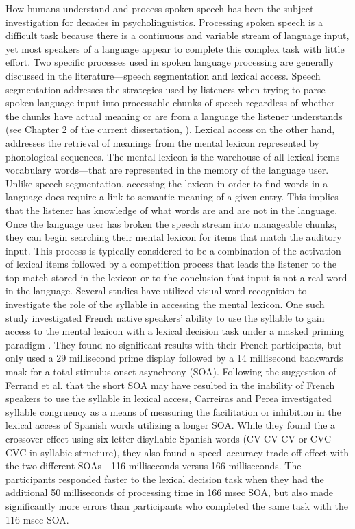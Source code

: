 How humans understand and process spoken speech has been the subject investigation for decades in psycholinguistics. Processing spoken speech is a difficult task because there is a continuous and variable stream of language input, yet most speakers of a language appear to complete this complex task with little effort. Two specific processes used in spoken language processing are generally discussed in the literature—speech segmentation and lexical access. 
Speech segmentation addresses the strategies used by listeners when trying to parse spoken language input into processable chunks of speech regardless of whether the chunks have actual meaning or are from a language the listener understands (see Chapter 2 of the current dissertation, \citep{Cutler2002-ge, Cutler1986-zl, Cutler1992-qq, Dumay2002-hx, Finney1996-fw, Mehler1981-le, Segui1981-uf, Tabossi2000-xn}). Lexical access on the other hand, addresses the retrieval of meanings from the mental lexicon represented by phonological sequences. The mental lexicon is the warehouse of all lexical items—vocabulary words—that are represented in the memory of the language user. Unlike speech segmentation, accessing the lexicon in order to find words in a language does require a link to semantic meaning of a given entry. This implies that the listener has knowledge of what words are and are not in the language. Once the language user has broken the speech stream into manageable chunks, they can begin searching their mental lexicon for items that match the auditory input. This process is typically considered to be a combination of the activation of lexical items followed by a competition process that leads the listener to the top match stored in the lexicon or to the conclusion that input is not a real-word in the language.
Several studies have utilized visual word recognition to investigate the role of the syllable in accessing the mental lexicon. One such study investigated French native speakers’ ability to use the syllable to gain access to the mental lexicon with a lexical decision task under a masked priming paradigm \parencite{Ferrand1996-vu}. They found no significant results with their French participants, but only used a 29 millisecond prime display followed by a 14 millisecond backwards mask for a total stimulus onset asynchrony (SOA). Following the suggestion of Ferrand et al. \parencite*{Ferrand1996-vu} that the short SOA may have resulted in the inability of French speakers to use the syllable in lexical access, Carreiras and Perea \parencite*{Carreiras2002-mp} investigated syllable congruency as a means of measuring the facilitation or inhibition in the lexical access of Spanish words utilizing a longer SOA. While they found the a crossover effect using six letter disyllabic Spanish words (CV-CV-CV or CVC-CVC in syllabic structure), they also found a speed–accuracy trade-off effect with the two different SOAs—116 milliseconds versus 166 milliseconds. The participants responded faster to the lexical decision task when they had the additional 50 milliseconds of processing time in 166 msec SOA, but also made significantly more errors than participants who completed the same task with the 116 msec SOA.
